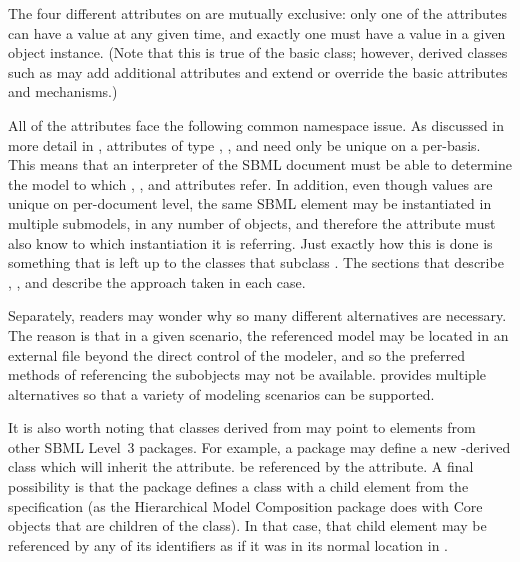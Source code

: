 The four different attributes on \SBaseRef are mutually exclusive: only one of the attributes can have a value at any given time, and exactly one must have a value in a given \SBaseRef object instance.  (Note that this is true of the basic \SBaseRef class; however, derived classes such as \ReplacedElement may add additional attributes and extend or override the basic attributes and mechanisms.)

All of the attributes face the following common namespace issue.  As discussed in more detail in , attributes of type , , and  need only be unique on a per-\Model basis.  This means that an interpreter of the SBML document must be able to determine the model to which , , and  attributes refer. In addition, even though  values are unique on per-document level, the same SBML element may be instantiated in multiple submodels, in any number of \Model objects, and therefore the  attribute must also know to which \Model instantiation it is referring. Just exactly how this is done is something that is left up to the classes that subclass \SBaseRef.  The sections that describe \Port, \Deletion, \ReplacedElement and \ReplacedBy describe the approach taken in each case.

Separately, readers may wonder why so many different alternatives are necessary.  The reason is that in a given scenario, the referenced model may be located in an external file beyond the direct control of the modeler, and so the preferred methods of referencing the subobjects may not be available.  \SBaseRef provides multiple alternatives so that a variety of modeling scenarios can be supported.

It is also worth noting that classes derived from \SBaseRef may point to elements from other SBML Level~3 packages.  For example, a package may define a new \SBase-derived class which will inherit the   attribute.   be referenced by the \SBaseRef {} attribute.  A final possibility is that the package defines a class with a child element from the \sbmlthreecore specification (as the Hierarchical Model Composition package does with Core \Model objects that are children of the \ListOfModelDefinitions class).  In that case, that child element may be referenced by any of its identifiers as if it was in its normal location in \sbmlthreecore.

